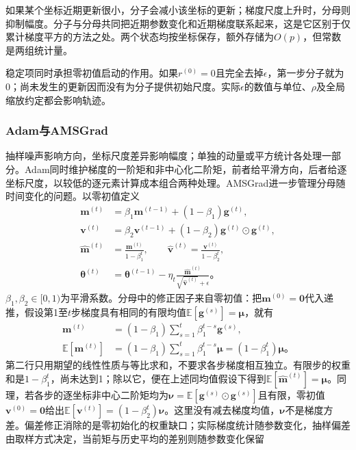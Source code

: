 如果某个坐标近期更新很小，分子会减小该坐标的更新；梯度尺度上升时，分母则抑制幅度。分子与分母共同把近期参数变化和近期梯度联系起来，这是它区别于仅累计梯度平方的方法之处。两个状态均按坐标保存，额外存储为$O(p)$，但常数是两组统计量。

稳定项同时承担零初值启动的作用。如果$r^{(0)}=0$且完全去掉$\epsilon$，第一步分子就为0；尚未发生的更新因而没有为分子提供初始尺度。实际$\epsilon$的数值与单位、$\rho$及全局缩放约定都会影响轨迹。

\subsubsection{Adam与AMSGrad}
\label{sec:training-adam}

抽样噪声影响方向，坐标尺度差异影响幅度；单独的动量或平方统计各处理一部分。Adam同时维护梯度的一阶矩和非中心化二阶矩，前者给平滑方向，后者给逐坐标尺度，以较低的逐元素计算成本组合两种处理。AMSGrad进一步管理分母随时间变化的问题。以零初值定义
\begin{align}
  \bm m^{(t)}&=\beta_1\bm m^{(t-1)}+(1-\beta_1)\bm g^{(t)},\\
  \bm v^{(t)}&=\beta_2\bm v^{(t-1)}+(1-\beta_2)
                 \bm g^{(t)}\odot\bm g^{(t)},\\
  \hat{\bm m}^{(t)}&=\frac{\bm m^{(t)}}{1-\beta_1^t},\qquad
  \hat{\bm v}^{(t)}=\frac{\bm v^{(t)}}{1-\beta_2^t},\\
  \bm\theta^{(t)}&=\bm\theta^{(t-1)}-
    \eta_t\frac{\hat{\bm m}^{(t)}}{\sqrt{\hat{\bm v}^{(t)}}+\epsilon}\text{。}
  \label{eq:training-adam}
\end{align}
$\beta_1,\beta_2\in[0,1)$为平滑系数。分母中的修正因子来自零初值：把$\bm m^{(0)}=\bm0$代入递推，假设第1至$t$步梯度具有相同的有限均值$\mathbb E[\bm g^{(s)}]=\bm\mu$，就有
\begin{equation}
  \begin{aligned}
    \bm m^{(t)}&=(1-\beta_1)\sum_{s=1}^{t}\beta_1^{t-s}\bm g^{(s)},\\
    \mathbb E[\bm m^{(t)}]
      &=(1-\beta_1)\sum_{s=1}^{t}\beta_1^{t-s}\bm\mu
        =(1-\beta_1^t)\bm\mu\text{。}
  \end{aligned}
  \label{eq:training-adam-bias-correction}
\end{equation}
第二行只用期望的线性性质与等比求和，不要求各步梯度相互独立。有限步的权重和是$1-\beta_1^t$，尚未达到1；除以它，便在上述同均值假设下得到$\mathbb E[\hat{\bm m}^{(t)}]=\bm\mu$。同理，若各步的逐坐标非中心二阶矩均为$\bm\nu=\mathbb E[\bm g^{(s)}\odot\bm g^{(s)}]$且有限，零初值$\bm v^{(0)}=\bm0$给出$\mathbb E[\bm v^{(t)}]=(1-\beta_2^t)\bm\nu$。这里没有减去梯度均值，$\bm\nu$不是梯度方差。偏差修正消除的是零初始化的权重缺口；实际梯度统计随参数变化，抽样偏差由取样方式决定，当前矩与历史平均的差别则随参数变化保留

